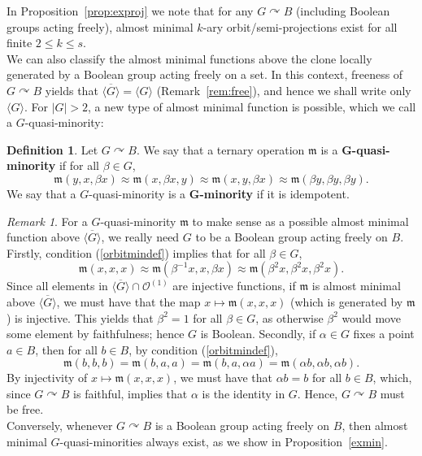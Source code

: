 \documentclass{article}
\theoremstyle{remark}
\newtheorem{remark}[theorem]{Remark}
\theoremstyle{definition}
\newtheorem{definition}[theorem]{Definition}
\def\acts{\curvearrowright}
\begin{document}
In Proposition~\ref{prop:exproj} we note that for any $G\acts B$ (including Boolean groups acting freely), almost minimal $k$-ary orbit\-/semi-projections exist for all finite $2\leq k\leq s$.\\









We can also classify the almost minimal functions above the clone locally generated by a Boolean group acting freely on a set. In this context, freeness of $G\acts B$ yields that $\overline{\langle G\rangle}=\langle G\rangle$ (Remark~\ref{rem:free}), and hence we shall write only $\langle G\rangle$. For $|G|>2$, a new type of almost minimal function is possible, which we call a $G$-quasi-minority:



\begin{definition}\label{deforbitmin}
   Let $G\acts B$. We say that a ternary operation  $\mathfrak{m}$ is a $\bm{G}$\textbf{-quasi-minority} if  for all $\beta \in G$, 
\begin{equation}\label{orbitmindef}
  \mathfrak{m}(y, x, \beta x)\approx \mathfrak{m}(x, \beta x, y)\approx \mathfrak{m}(x, y, \beta x)\approx \mathfrak{m}(\beta y, \beta y, \beta y).  
\end{equation}
We say that a $G$-quasi-minority is a $\bm{G}$\textbf{-minority} if it is idempotent. 
\end{definition}

\begin{remark}
For a $G$-quasi-minority $\mathfrak{m}$ to make sense as a possible almost minimal function above $\overline{\langle G\rangle}$, we really need $G$ to be a Boolean group acting freely on $B$. Firstly, condition (\ref{orbitmindef}) implies that for all $\beta\in G$,
\[\mathfrak{m}(x,x,x)\approx \mathfrak{m}(\beta^{-1}x, x, \beta x)\approx \mathfrak{m}(\beta^2 x, \beta^2 x, \beta^2 x).\]
Since all elements in $\overline{\langle G\rangle}\cap\mathcal{O}^{(1)}$ are injective functions, if $\mathfrak m$ is almost minimal above $\overline{\langle G\rangle}$, we must have that the map  $x\mapsto \mathfrak{m}(x,x,x)$ (which is generated by $\mathfrak{m}$) is injective. This yields that $\beta^2=1$ for all $\beta\in G$, as otherwise $\beta^2$ would move some element by faithfulness; hence $G$ is Boolean. Secondly, if $\alpha\in G$ fixes a point $a\in B$, then for all $b\in B$, by condition (\ref{orbitmindef}),
\[\mathfrak{m}(b,b,b)=\mathfrak{m}(b,a, a)=\mathfrak{m}(b,a, \alpha a)=\mathfrak{m}(\alpha b, \alpha b, \alpha b).\]
By injectivity of $x\mapsto \mathfrak{m}(x,x,x)$, we must have that $\alpha b= b$ for all $b\in B$, which, since $G\acts B$ is faithful, implies that $\alpha$ is the identity in $G$. Hence, $G\acts B$ must be free.\\

Conversely, whenever $G\acts B$ is a Boolean group acting freely on $B$, then  almost minimal $G$-quasi-minorities always exist, as we show in Proposition~\ref{exmin}.
\end{remark}
\end{document}
